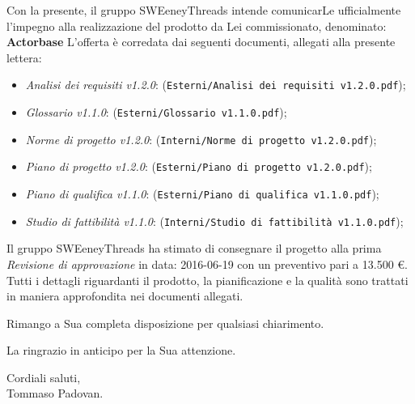 \documentclass[a4paper]{article}
\begin{document}
	\vspace{5mm}Con la presente, il gruppo SWEeneyThreads intende comunicarLe ufficialmente l'impegno 
	alla realizzazione del prodotto da Lei commissionato, denominato: {\textbf{Actorbase}} \newline
	L'offerta è corredata dai seguenti documenti, allegati alla presente lettera:
	\begin{itemize}
		\item \emph{Analisi dei requisiti v1.2.0}: (\verb|Esterni/Analisi dei requisiti v1.2.0.pdf|);
		\item \emph{Glossario v1.1.0}: (\verb|Esterni/Glossario v1.1.0.pdf|);
		\item \emph{Norme di progetto v1.2.0}: (\verb|Interni/Norme di progetto v1.2.0.pdf|);
		\item \emph{Piano di progetto v1.2.0}: (\verb|Esterni/Piano di progetto v1.2.0.pdf|);
		\item \emph{Piano di qualifica v1.1.0}: (\verb|Esterni/Piano di qualifica v1.1.0.pdf|);
		\item \emph{Studio di fattibilità v1.1.0}: (\verb|Interni/Studio di fattibilità v1.1.0.pdf|);
	\end{itemize}
	Il gruppo SWEeneyThreads ha stimato di consegnare il progetto alla prima \emph{Revisione di approvazione}
	in data: 2016-06-19 con un preventivo pari a 13.500 \euro .
	Tutti i dettagli riguardanti il prodotto, la pianificazione e la qualità sono trattati in maniera approfondita 
	nei documenti allegati.
	\begin{flushleft}
	\vspace{2cm}
		Rimango a Sua completa disposizione per qualsiasi chiarimento.
	\end{flushleft}
	\begin{flushleft}
		La ringrazio in anticipo per la Sua attenzione.
	\end{flushleft}
	\vspace{5mm}
	\begin{center}
		Cordiali saluti,\\
		\vspace{1cm}Tommaso Padovan.
	\end{center}
	
\end{document}
